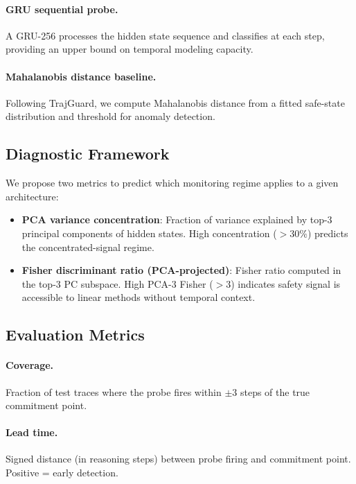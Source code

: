 \documentclass[11pt]{article}
\begin{document}
\paragraph{GRU sequential probe.} A GRU-256 processes the hidden state sequence and classifies at each step, providing an upper bound on temporal modeling capacity.

\paragraph{Mahalanobis distance baseline.} Following TrajGuard, we compute Mahalanobis distance from a fitted safe-state distribution and threshold for anomaly detection.

\subsection{Diagnostic Framework}

We propose two metrics to predict which monitoring regime applies to a given architecture:

\begin{itemize}
    \item \textbf{PCA variance concentration}: Fraction of variance explained by top-3 principal components of hidden states. High concentration ($>30\%$) predicts the concentrated-signal regime.
    \item \textbf{Fisher discriminant ratio (PCA-projected)}: Fisher ratio computed in the top-3 PC subspace. High PCA-3 Fisher ($>3$) indicates safety signal is accessible to linear methods without temporal context.
\end{itemize}

\subsection{Evaluation Metrics}

\paragraph{Coverage.} Fraction of test traces where the probe fires within $\pm 3$ steps of the true commitment point.

\paragraph{Lead time.} Signed distance (in reasoning steps) between probe firing and commitment point. Positive = early detection.
\end{document}
